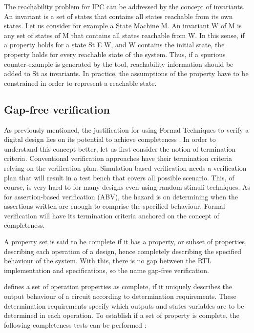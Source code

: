 The reachability problem for IPC can be addressed by the concept of invariants. An invariant is a set of states that contains all states reachable from its own states. Let us consider for example a State Machine M. An invariant W of M is any set of states of M that contains all states reachable from W. In this sense, if a property holds for a state St E W, and W contains the initial state, the property holds for every reachable state of the system. Thus, if a spurious counter-example is generated by the tool, reachability information should be added to St as invariants. In practice, the assumptions of the property have to be constrained in order to represent a reachable state. 

\subsection{Gap-free verification}

As previously mentioned, the justification for using Formal Techniques to verify a digital design lies on its potential to achieve completeness . In order to understand this concept better, let us first consider the notion of termination criteria. Conventional verification approaches have their termination criteria relying on the verification plan. Simulation based verification needs a verification plan that will result in a test bench that covers all possible  scenario. This, of course, is very hard to  for many designs even using random stimuli techniques. As for assertion-based verification (ABV), the hazard is on determining when the assertions written are enough to comprise the specified behaviour. Formal verification will have its termination criteria anchored on the concept of completeness.

A property set is said to be complete if it has a property, or subset of properties, describing each operation of a design, hence completely describing the specified behaviour of the system. With this, there is no gap between the RTL implementation and specifications, so the name  gap-free verification. 

 \cite{paper-gapfree} defines a set of operation properties as complete, if it uniquely describes the output behaviour of a circuit according to determination requirements. These determination requirements specify which outputs and states variables are to be determined in each operation. To establish if a set of property is complete, the following completeness tests can be performed \cite{guide-onespin}:

